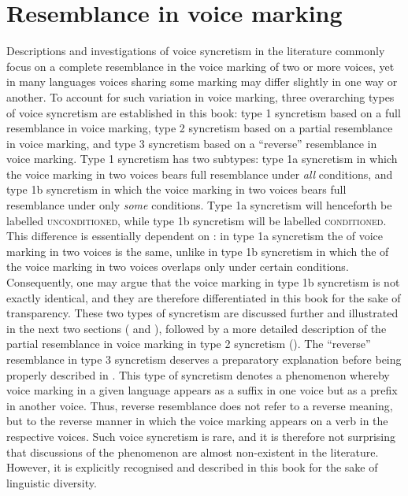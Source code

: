 \section{Resemblance in voice marking} \label{resemblance}
Descriptions and investigations of voice syncretism in the literature commonly focus on a complete resemblance in the voice marking of two or more voices, yet in many languages voices sharing some marking may differ slightly in one way or another. To account for such variation in voice marking, three overarching types of voice syncretism are established in this book: type 1 syncretism based on a full resemblance in voice marking, type 2 syncretism based on a partial resemblance in voice marking, and type 3 syncretism based on a “reverse” resemblance in voice marking. Type 1 syncretism has two subtypes: type 1a syncretism in which the voice marking in two voices bears full resemblance under \textit{all} conditions, and type 1b syncretism in which the voice marking in two voices bears full resemblance under only \textit{some} conditions. Type 1a syncretism will henceforth be labelled \textsc{unconditioned}, while type 1b syncretism will be labelled \textsc{conditioned}. This difference is essentially dependent on : in type 1a syncretism the  of voice marking in two voices is the same, unlike in type 1b syncretism in which the  of the voice marking in two voices overlaps only under certain conditions. Consequently, one may argue that the voice marking in type 1b syncretism is not exactly identical, and they are therefore differentiated in this book for the sake of transparency. These two types of syncretism are discussed further and illustrated in the next two sections ( and ), followed by a more detailed description of the partial resemblance in voice marking in type 2 syncretism (). The “reverse” resemblance in type 3 syncretism deserves a preparatory explanation before being properly described in . This type of syncretism denotes a phenomenon whereby voice marking in a given language appears as a suffix in one voice but as a prefix in another voice. Thus, reverse resemblance does not refer to a reverse meaning, but to the reverse manner in which the voice marking appears on a verb in the respective voices. Such voice syncretism is rare, and it is therefore not surprising that discussions of the phenomenon are almost non-existent in the literature. However, it is explicitly recognised and described in this book for the sake of linguistic diversity.  

